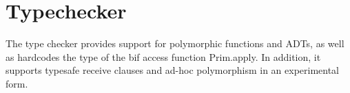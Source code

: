 \section{Typechecker}

The type checker provides support for polymorphic functions and ADTs, as well as hardcodes the type of the bif access function Prim.apply. In addition, it supports typesafe receive clauses and ad-hoc polymorphism in an experimental form.